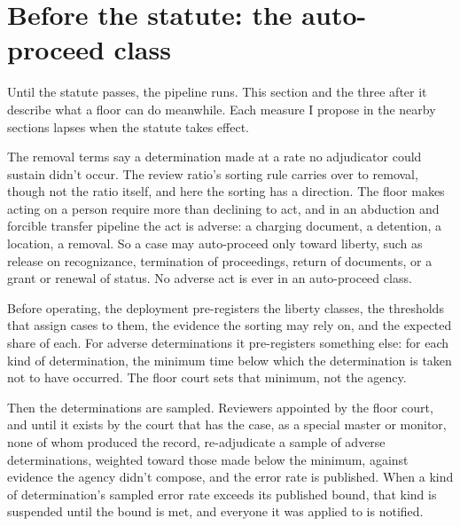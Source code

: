 \section{Before the statute: the auto-proceed class}
\label{sec:11.5}
Until the statute passes, the pipeline runs. This section and the three after it describe what a floor can do meanwhile. Each measure I propose in the nearby sections lapses when the statute takes effect.

The removal terms say a determination made at a rate no adjudicator could sustain didn't occur. The review ratio's sorting rule carries over to removal, though not the ratio itself, and here the sorting has a direction. The floor makes acting on a person require more than declining to act, and in an abduction and forcible transfer pipeline the act is adverse: a charging document, a detention, a location, a removal. So a case may auto-proceed only toward liberty, such as release on recognizance, termination of proceedings, return of documents, or a grant or renewal of status. No adverse act is ever in an auto-proceed class.

Before operating, the deployment pre-registers the liberty classes, the thresholds that assign cases to them, the evidence the sorting may rely on, and the expected share of each. For adverse determinations it pre-registers something else: for each kind of determination, the minimum time below which the determination is taken not to have occurred. The floor court sets that minimum, not the agency.

Then the determinations are sampled. Reviewers appointed by the floor court, and until it exists by the court that has the case, as a special master or monitor, none of whom produced the record, re-adjudicate a sample of adverse determinations, weighted toward those made below the minimum, against evidence the agency didn't compose, and the error rate is published. When a kind of determination's sampled error rate exceeds its published bound, that kind is suspended until the bound is met, and everyone it was applied to is notified.
